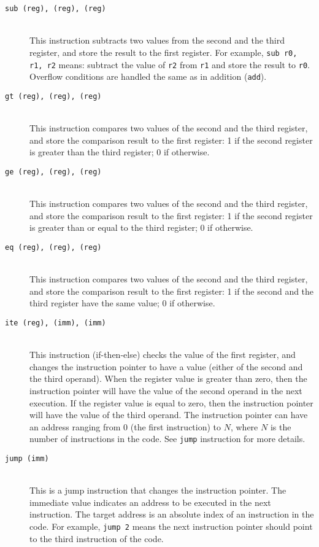 \documentclass[a4paper, 11pt]{article}
\theoremstyle{definition}
\begin{document}
{\begin{description}
  \item [\texttt{sub (reg), (reg), (reg)}]~\\
    This instruction subtracts two values from the second and the
    third register, and store the result to the first register. For
    example, \texttt{sub r0, r1, r2} means: subtract the value of
    \texttt{r2} from \texttt{r1} and store the result to \texttt{r0}.
    Overflow conditions are handled the same as in addition
    (\texttt{add}).

  \item [\texttt{gt (reg), (reg), (reg)}]~\\
    This instruction compares two values of the second and
    the third register, and store the comparison result to the first
    register: 1 if the second register is greater than the third
    register; 0 if otherwise.

  \item [\texttt{ge (reg), (reg), (reg)}]~\\
    This instruction compares two values of the second and
    the third register, and store the comparison result to the first
    register: 1 if the second register is greater than or equal to the
    third register; 0 if otherwise.

  \item [\texttt{eq (reg), (reg), (reg)}]~\\
    This instruction compares two values of the second and
    the third register, and store the comparison result to the first
    register: 1 if the second and the third register have the same
    value; 0 if otherwise.

  \item [\texttt{ite (reg), (imm), (imm)}]~\\
    This instruction (if-then-else) checks the value of the first
    register, and changes the instruction pointer to have a value
    (either of the second and the third operand). When the register
    value is greater than zero, then the instruction pointer will have
    the value of the second operand in the next execution. If the
    register value is equal to zero, then the instruction pointer will
    have the value of the third operand. The instruction pointer can
    have an address ranging from 0 (the first instruction) to $N$,
    where $N$ is the number of instructions in the code. See
    \texttt{jump} instruction for more details.

  \item [\texttt{jump (imm)}]~\\
    This is a jump instruction that changes the instruction pointer.
    The immediate value indicates an address to be executed in the
    next instruction. The target address is an absolute index of an
    instruction in the code. For example, \texttt{jump 2} means the
    next instruction pointer should point to the third instruction of
    the code.


\end{description}}
\end{document}
